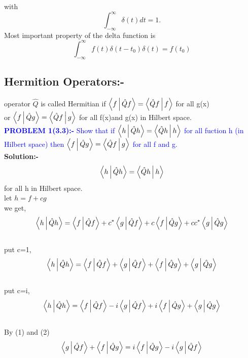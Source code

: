 with $$\int_{-\infty}^{\infty}\delta(t)dt=1.$$
Most important property of the delta function is $$\int_{-\infty}^{\infty}f(t)\delta(t-t_{0})\delta(t)=f(t_{0})$$
\subsection{Hermition Operators:-}
\hspace*{6cm} operator $\hat{Q}$ is called Hermitian if $\Braket{f|\hat{Q}f}=\Braket{\hat{Q}f|f}$ for all g(x)
\\or $\Braket{f|\hat{Q}g}=\Braket{\hat{Q}f|g}$ for all f(x)and g(x) in Hilbert space.\\

\textcolor{blue}{ \textbf{PROBLEM 1(3.3):-} Show that if $\Braket{h|\hat{Q}h}=\Braket{\hat{Q}h|h}$ for all fuction h (in Hilbert space) then $\Braket{f|\hat{Q}g}=\Braket{\hat{Q}f|g}$ for all f and g.}\\

\textbf{Solution:-}
$$\Braket{h|\hat{Q}h}=\Braket{\hat{Q}h|h}$$ for all h in Hilbert space.\\
 let $h=f+cg$\\
 we get,\\
 $$
 \Braket{h|\hat{Q}h}=\Braket{f|\hat{Q}f}+c^{*}\Braket{g|\hat{Q}f}+c\Braket{f|\hat{Q}g}+cc^{*}\Braket{g|\hat{Q}g}$$\\
 put c=1,
\begin{equation}
\Braket{h|\hat{Q}h}=\Braket{f|\hat{Q}f}+\Braket{g|\hat{Q}f}+\Braket{f|\hat{Q}g}+\Braket{g|\hat{Q}g}
\end{equation}\\
put c=i,
\begin{equation}
\Braket{h|\hat{Q}h}=\Braket{f|\hat{Q}f}-i\Braket{g|\hat{Q}f}+i\Braket{f|\hat{Q}g}+\Braket{g|\hat{Q}g}
\end{equation}\\
By (1) and (2)\\
\begin{equation}
\Braket{g|\hat{Q}f}+\Braket{f|\hat{Q}g}=i\Braket{f|\hat{Q}g}-i\Braket{g|\hat{Q}f}
\end{equation}

